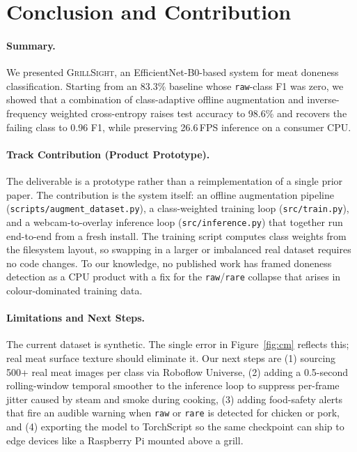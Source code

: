 \documentclass{article}
\begin{document}
\section{Conclusion and Contribution}
\label{sec:conclusion}

\paragraph{Summary.} We presented \textsc{GrillSight}, an EfficientNet-B0-based
system for meat doneness classification. Starting from an 83.3\%
baseline whose \texttt{raw}-class F1 was zero, we showed that a
combination of class-adaptive offline augmentation and
inverse-frequency weighted cross-entropy raises test accuracy to
98.6\% and recovers the failing class to 0.96 F1, while preserving 26.6\,FPS
inference on a consumer CPU.

\paragraph{Track Contribution (Product Prototype).} The deliverable is a
prototype rather than a reimplementation of a single prior paper.
The contribution is the system itself: an offline augmentation
pipeline (\texttt{scripts/augment\_dataset.py}), a class-weighted training
loop (\texttt{src/train.py}), and a webcam-to-overlay inference loop
(\texttt{src/inference.py}) that together run end-to-end from a fresh
install. The training script computes class weights from the
filesystem layout, so swapping in a larger or imbalanced real dataset
requires no code changes. To our knowledge, no published work has framed
doneness detection as a CPU product with a
fix for the \texttt{raw}/\texttt{rare} collapse that arises in
colour-dominated training data.

\paragraph{Limitations and Next Steps.} The current dataset is synthetic.
The single error in Figure~\ref{fig:cm} reflects this; real meat
surface texture should eliminate it. Our next steps are (1) sourcing 500+
real meat images per class via Roboflow Universe, (2) adding a 0.5-second
rolling-window temporal smoother to the inference loop to suppress
per-frame jitter caused by steam and smoke during cooking, (3)
adding food-safety alerts that fire an audible warning when \texttt{raw} or
\texttt{rare} is detected for chicken or pork, and (4)
exporting the model to TorchScript so the same checkpoint can ship to
edge devices like a Raspberry Pi mounted above a grill.
\end{document}
